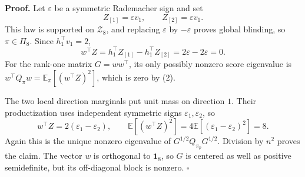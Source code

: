 \textbf{Proof.}
Let \(\varepsilon\) be a symmetric Rademacher sign and set
\[
Z_{[1]}=\varepsilon v_1,
\qquad
Z_{[2]}=\varepsilon v_1.
\tag{1}
\]
This law is supported on \(\mathcal Z_8\), and replacing \(\varepsilon\) by \(-\varepsilon\) proves global blinding, so \(\pi\in\Pi_8\).  Since \(h_1^\top v_1=2\),
\[
w^\top Z
=h_1^\top Z_{[1]}-h_1^\top Z_{[2]}
=2\varepsilon-2\varepsilon=0.
\tag{2}
\]
For the rank-one matrix \(G=ww^\top\), its only possibly nonzero score eigenvalue is \(w^\top Q_\pi w=\mathbb E_\pi[(w^\top Z)^2]\), which is zero by (2).

The two local direction marginals put unit mass on direction \(1\).  Their productization uses independent symmetric signs \(\varepsilon_1,\varepsilon_2\), so
\[
w^\top Z=2(\varepsilon_1-\varepsilon_2),
\qquad
\mathbb E[(w^\top Z)^2]
=4\mathbb E[(\varepsilon_1-\varepsilon_2)^2]=8.
\tag{3}
\]
Again this is the unique nonzero eigenvalue of \(G^{1/2}Q_{\pi_p}G^{1/2}\).  Division by \(n^2\) proves the claim.  The vector \(w\) is orthogonal to \(\mathbf 1_8\), so \(G\) is centered as well as positive semidefinite, but its off-diagonal block is nonzero. \(\square\)